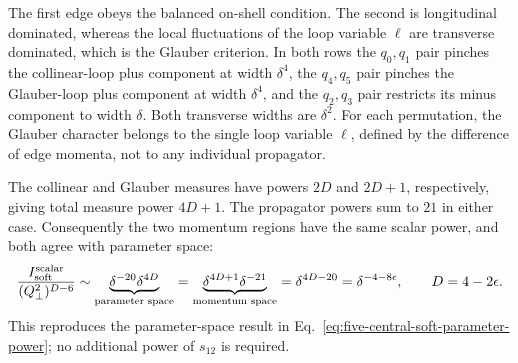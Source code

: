 \documentclass[a4paper,11pt]{article}
\begin{document}
The first edge obeys the balanced on-shell condition.  The second is longitudinal dominated,
whereas the local fluctuations of the loop variable \(\ell\) are
transverse dominated, which is the Glauber criterion.
In both rows the \(q_0,q_1\) pair pinches the collinear-loop plus component at
width \(\delta^4\), the \(q_4,q_5\) pair pinches the Glauber-loop plus component
at width \(\delta^4\), and the \(q_2,q_3\) pair restricts its minus
component to width \(\delta\).  Both transverse widths are
\(\delta^2\).  For each permutation, the Glauber character belongs to the
single loop variable \(\ell\), defined by the difference of edge momenta,
not to any individual propagator.

The collinear and Glauber measures have powers \(2D\) and \(2D+1\),
respectively, giving total measure power \(4D+1\).  The propagator powers
sum to \(21\) in either case.  Consequently the two momentum regions have
the same scalar power, and both agree with parameter space:
\begin{equation}
 \frac{I_{\rm soft}^{\rm scalar}}{(Q_\perp^2)^{D-6}}\sim
 \underbrace{\delta^{-20}\delta^{4D}}_{\text{parameter space}}
 =\underbrace{\delta^{4D+1}\delta^{-21}}_{\text{momentum space}}
 =\delta^{4D-20}
 =\delta^{-4-8\epsilon},\qquad D=4-2\epsilon.
 \label{eq:five-central-soft-power}
\end{equation}
This reproduces the parameter-space result in
Eq.~\eqref{eq:five-central-soft-parameter-power}; no additional power of
\(s_{12}\) is required.

\fi

\end{document}
